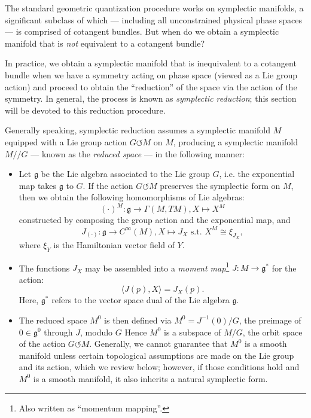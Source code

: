The standard geometric quantization procedure works on symplectic manifolds, a significant subclass of which --- including all unconstrained physical phase spaces --- is comprised of cotangent bundles. But when do we obtain a symplectic manifold that is \emph{not} equivalent to a cotangent bundle?

In practice, we obtain a symplectic manifold that is inequivalent to a cotangent bundle when we have a symmetry acting on phase space (viewed as a Lie group action) and proceed to obtain the ``reduction'' of the space via the action of the symmetry. In general, the process is known as \emph{symplectic reduction}; this section will be devoted to this reduction procedure.

Generally speaking, symplectic reduction assumes a symplectic manifold $M$ equipped with a Lie group action $G \circlearrowleft M$ on $M$, producing a symplectic manifold $M // G$ --- known as the \emph{reduced space} --- in the following manner:

\begin{itemize}
\item Let $\mathfrak{g}$ be the Lie algebra associated to the Lie group $G$, i.e. the exponential map takes $\mathfrak{g}$ to $G$. If the action $G \circlearrowleft M$ preserves the symplectic form on $M$, then we obtain the following homomorphisms of Lie algebras:
$$
(\cdot)^M : \mathfrak{g} \to \Gamma(M,TM), X \mapsto X^M
$$
constructed by composing the group action and the exponential map, and  %
$$
J_{(\cdot)}: \mathfrak{g} \to C^\infty(M), X \mapsto J_X \mbox{ s.t. } X^M \cong \xi_{J_X},
$$
where $\xi_Y$ is the Hamiltonian vector field of $Y$.

\item The functions $J_X$ may be assembled into a \emph{moment map}\footnote{Also written as ``momentum mapping''.} $J: M \to \mathfrak{g}^*$ for the action:
$$
\langle J(p) , X \rangle = J_X(p).
$$
Here, $\mathfrak{g}^*$ refers to the vector space dual of the Lie algebra $\mathfrak{g}$.

\item The reduced space $M^0$ is then defined via $M^0 = J^{-1}(0) / G$, the preimage of $0 \in \mathfrak{g}^0$ through $J$, modulo $G$ Hence $M^0$ is a subspace of $M / G$, the orbit space of the action $G \circlearrowleft M$. Generally, we cannot guarantee that $M^0$ is a smooth manifold unless certain topological assumptions are made on the Lie group and its action, which we review below; however, if those conditions hold and $M^0$ is a smooth manifold, it also inherits a natural symplectic form.
\end{itemize}

